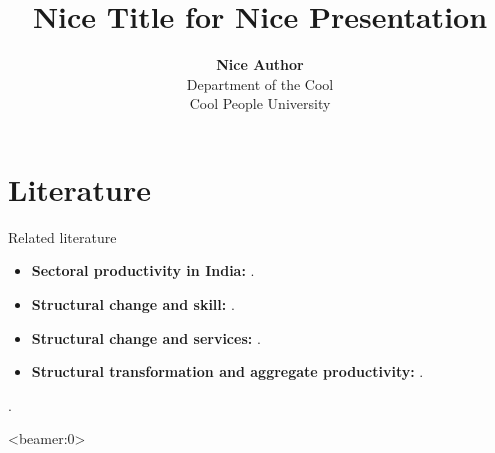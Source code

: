 \documentclass[10pt,xcolor={svgnames}]{beamer}
\begin{document}
\title[]{\textbf{Nice Title for Nice Presentation}}
\author[Nice Author]{\textbf{Nice Author} \\
Department of the Cool \\
Cool People University}
\date[]{}

\AtBeginSection[]{\frame{\sectionpage}}
\AtBeginSubsection[]{\frame{\subsectionpage}}

\begin{frame}
	\titlepage
\end{frame}

\section{Literature}

\begin{frame}{Related literature}
	\begin{itemize}
		\item \textbf{Sectoral productivity in India:} \citep{rodrik2004hindugrowth,sivasubramonian2004humancapital,hsieh2009misallocation,broadberry2010historical,eichengreen2011servicegrowth,verma2012tfp,ziebarth2013misallocation,garciasantana2014reservationlaws}.
		\item \textbf{Structural change and skill:} \citep{buera2018skillbiasedstructchange,herrendorf2018humancapital,herrendorf2019China,herrendorf2015endogenous}.
		\item \textbf{Structural change and services:} \citep{buera2012service,duernecker2017structural,duarte2019pricesproductivity}.
		\item \textbf{Structural transformation and aggregate productivity:} \citep{ngai2007structural,restuccia2008aggregateproductivity,duarte2010aggregateproductivity,rodrik2016premature,mcmillanrodrik2014africa}.
	\end{itemize}
\end{frame}

\begin{frame}
	\citet{turnovsky2016population}.
\end{frame}

\begin{frame}<beamer:0>


\end{frame}
\end{document}
